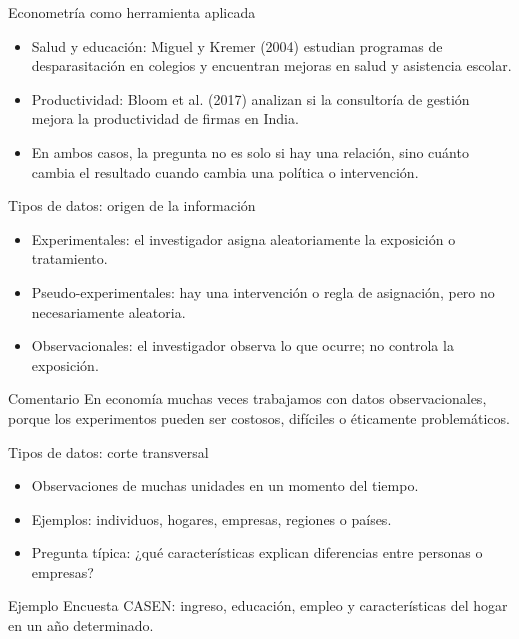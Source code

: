 \documentclass{beamer}
\begin{document}
\begin{frame}{Econometr\'ia como herramienta aplicada}

\begin{itemize}
    \item {\color{blue}Salud y educación:} Miguel y Kremer (2004) estudian programas de desparasitación en colegios y encuentran mejoras en salud y asistencia escolar.
    \item {\color{blue}Productividad:} Bloom et al. (2017) analizan si la consultoría de gestión mejora la productividad de firmas en India.
    \item En ambos casos, la pregunta no es solo si hay una relación, sino cuánto cambia el resultado cuando cambia una política o intervención.
\end{itemize}
    \end{frame}


\begin{frame}{Tipos de datos: origen de la información}
      

\begin{itemize}
    \item {\color{blue}Experimentales}: el investigador asigna aleatoriamente la exposición o tratamiento.
    \item {\color{blue}Pseudo-experimentales}: hay una intervención o regla de asignación, pero no necesariamente aleatoria.
    \item {\color{blue}Observacionales}: el investigador observa lo que ocurre; no controla la exposición.
\end{itemize}

\begin{block}{Comentario}
En economía muchas veces trabajamos con datos observacionales, porque los experimentos pueden ser costosos, difíciles o éticamente problemáticos.
\end{block}
\end{frame}

\begin{frame}{Tipos de datos: corte transversal}

\begin{itemize}
    \item Observaciones de muchas unidades en un momento del tiempo.
    \item Ejemplos: individuos, hogares, empresas, regiones o países.
    \item Pregunta típica: ¿qué características explican diferencias entre personas o empresas?
\end{itemize}

\begin{block}{Ejemplo}
Encuesta CASEN: ingreso, educación, empleo y características del hogar en un año determinado.
\end{block}
\end{frame}
\end{document}

